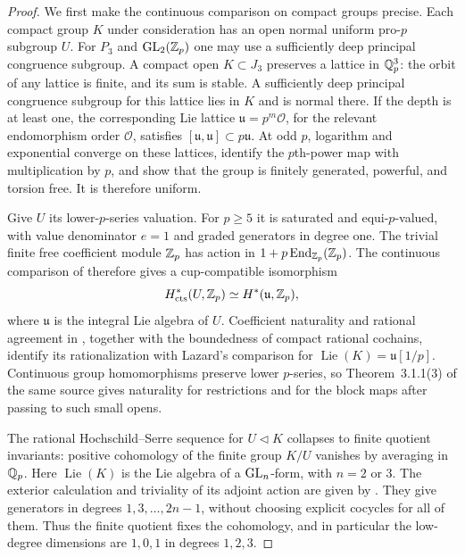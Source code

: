 \begin{proof}
We first make the continuous comparison on compact groups precise.
Each compact group $K$ under consideration has an open normal uniform
pro-$p$ subgroup $U$.  For $P_3$ and $\operatorname{GL}_2(\mathbb Z_p)$ one may use a
sufficiently deep principal congruence subgroup.  A compact open
$K\subset J_3$ preserves a lattice in $\mathbb Q_p^3$: the orbit of any
lattice is finite, and its sum is stable.  A sufficiently deep
principal congruence subgroup for this lattice lies in $K$ and is
normal there.  If the depth is at least one, the corresponding Lie
lattice $\mathfrak u=p^m\mathcal O$, for the relevant endomorphism
order $\mathcal O$, satisfies
$[\mathfrak u,\mathfrak u]\subset p\mathfrak u$.  At odd $p$,
logarithm and exponential converge on these lattices, identify the
$p$th-power map with multiplication by $p$, and show that the group
is finitely generated, powerful, and torsion free.  It is therefore
uniform.

Give $U$ its lower-$p$-series valuation.  For $p\geq5$ it is saturated
and equi-$p$-valued, with value denominator $e=1$ and graded generators
in degree one.  The trivial finite free coefficient module $\mathbb Z_p$
has action in $1+p\operatorname{End}_{\mathbb Z_p}(\mathbb Z_p)$.  The continuous
comparison of \cite[Theorem~3.3.3]{HuberKingsNaumann} therefore gives
a cup-compatible isomorphism
\[
 H^*_{\mathrm{cts}}(U,\mathbb Z_p)\simeq H^*(\mathfrak u,\mathbb Z_p),
\]
where $\mathfrak u$ is the integral Lie algebra of $U$.
Coefficient naturality and rational agreement in
\cite[Theorem~3.1.1(1)--(2)]{HuberKingsNaumann}, together with the
boundedness of compact rational cochains, identify its rationalization
with Lazard's comparison for $\operatorname{Lie}(K)=\mathfrak u[1/p]$.
Continuous group homomorphisms preserve lower $p$-series, so
Theorem~3.1.1(3) of the same source gives naturality for restrictions
and for the block maps after passing to such small opens.

The rational Hochschild--Serre sequence for $U\triangleleft K$
collapses to finite quotient invariants: positive cohomology of the
finite group $K/U$ vanishes by averaging in $\mathbb Q_p$.  Here
$\operatorname{Lie}(K)$ is the Lie algebra of a $\operatorname{GL}_n$-form, with $n=2$ or $3$.
The exterior calculation and triviality of its adjoint action are
given by \cite[Lemma~3.8.2]{BSSW}.  They give generators in degrees
$1,3,\ldots,2n-1$, without choosing explicit cocycles for all of them.
Thus the finite quotient fixes the cohomology, and in particular the
low-degree dimensions are $1,0,1$ in degrees $1,2,3$.


\end{proof}
